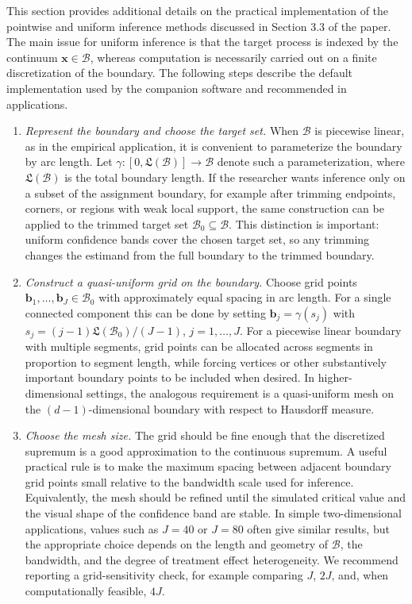 \documentclass[10pt]{article}
\newcommand{\bb}{\mathbf{b}}
\newcommand{\bx}{\mathbf{x}}
\newcommand{\B}{\mathcal{B}}
\begin{document}
This section provides additional details on the practical implementation of the pointwise and uniform inference methods discussed in Section 3.3 of the paper. The main issue for uniform inference is that the target process is indexed by the continuum $\bx\in\B$, whereas computation is necessarily carried out on a finite discretization of the boundary. The following steps describe the default implementation used by the companion software and recommended in applications.

\begin{enumerate}[leftmargin=*]

    \item \textit{Represent the boundary and choose the target set.}
    When $\B$ is piecewise linear, as in the empirical application, it is convenient to parameterize the boundary by arc length. Let $\gamma:[0,\mathfrak{L}(\B)]\to\B$ denote such a parameterization, where $\mathfrak{L}(\B)$ is the total boundary length. If the researcher wants inference only on a subset of the assignment boundary, for example after trimming endpoints, corners, or regions with weak local support, the same construction can be applied to the trimmed target set $\B_0\subseteq\B$. This distinction is important: uniform confidence bands cover the chosen target set, so any trimming changes the estimand from the full boundary to the trimmed boundary.

    \item \textit{Construct a quasi-uniform grid on the boundary.}
    Choose grid points $\bb_1,\ldots,\bb_J\in\B_0$ with approximately equal spacing in arc length. For a single connected component this can be done by setting $\bb_j=\gamma(s_j)$ with $s_j=(j-1)\mathfrak{L}(\B_0)/(J-1)$, $j=1,\ldots,J$. For a piecewise linear boundary with multiple segments, grid points can be allocated across segments in proportion to segment length, while forcing vertices or other substantively important boundary points to be included when desired. In higher-dimensional settings, the analogous requirement is a quasi-uniform mesh on the $(d-1)$-dimensional boundary with respect to Hausdorff measure.

    \item \textit{Choose the mesh size.}
    The grid should be fine enough that the discretized supremum is a good approximation to the continuous supremum. A useful practical rule is to make the maximum spacing between adjacent boundary grid points small relative to the bandwidth scale used for inference. Equivalently, the mesh should be refined until the simulated critical value and the visual shape of the confidence band are stable. In simple two-dimensional applications, values such as $J=40$ or $J=80$ often give similar results, but the appropriate choice depends on the length and geometry of $\B$, the bandwidth, and the degree of treatment effect heterogeneity. We recommend reporting a grid-sensitivity check, for example comparing $J$, $2J$, and, when computationally feasible, $4J$.


\end{enumerate}
\end{document}
